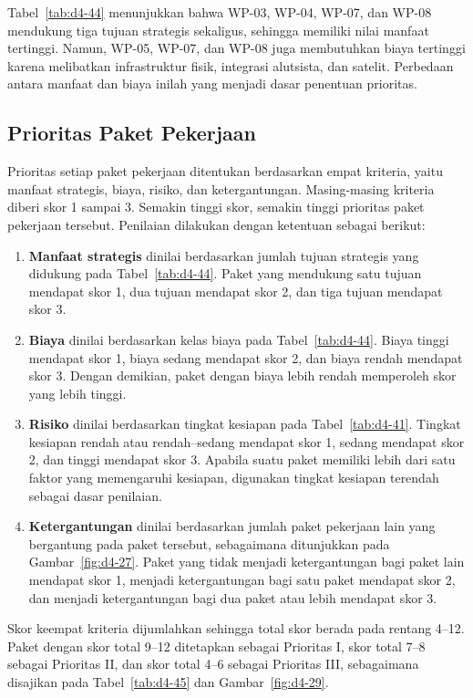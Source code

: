 Tabel~\ref{tab:d4-44} menunjukkan bahwa WP-03, WP-04, WP-07, dan WP-08 mendukung tiga tujuan strategis sekaligus, sehingga memiliki nilai manfaat tertinggi. Namun, WP-05, WP-07, dan WP-08 juga membutuhkan biaya tertinggi karena melibatkan infrastruktur fisik, integrasi alutsista, dan satelit. Perbedaan antara manfaat dan biaya inilah yang menjadi dasar penentuan prioritas.

\subsection{Prioritas Paket Pekerjaan}

Prioritas setiap paket pekerjaan ditentukan berdasarkan empat kriteria, yaitu manfaat strategis, biaya, risiko, dan ketergantungan. Masing-masing kriteria diberi skor 1 sampai 3. Semakin tinggi skor, semakin tinggi prioritas paket pekerjaan tersebut. Penilaian dilakukan dengan ketentuan sebagai berikut:

\begin{enumerate}[label=\alph*.]
  \item \textbf{Manfaat strategis} dinilai berdasarkan jumlah tujuan strategis yang didukung pada Tabel~\ref{tab:d4-44}. Paket yang mendukung satu tujuan mendapat skor 1, dua tujuan mendapat skor 2, dan tiga tujuan mendapat skor 3.
  \item \textbf{Biaya} dinilai berdasarkan kelas biaya pada Tabel~\ref{tab:d4-44}. Biaya tinggi mendapat skor 1, biaya sedang mendapat skor 2, dan biaya rendah mendapat skor 3. Dengan demikian, paket dengan biaya lebih rendah memperoleh skor yang lebih tinggi.
  \item \textbf{Risiko} dinilai berdasarkan tingkat kesiapan pada Tabel~\ref{tab:d4-41}. Tingkat kesiapan rendah atau rendah–sedang mendapat skor 1, sedang mendapat skor 2, dan tinggi mendapat skor 3. Apabila suatu paket memiliki lebih dari satu faktor yang memengaruhi kesiapan, digunakan tingkat kesiapan terendah sebagai dasar penilaian.
  \item \textbf{Ketergantungan} dinilai berdasarkan jumlah paket pekerjaan lain yang bergantung pada paket tersebut, sebagaimana ditunjukkan pada Gambar~\ref{fig:d4-27}. Paket yang tidak menjadi ketergantungan bagi paket lain mendapat skor 1, menjadi ketergantungan bagi satu paket mendapat skor 2, dan menjadi ketergantungan bagi dua paket atau lebih mendapat skor 3.
\end{enumerate}
Skor keempat kriteria dijumlahkan sehingga total skor berada pada rentang 4–12. Paket dengan skor total 9–12 ditetapkan sebagai Prioritas I, skor total 7–8 sebagai Prioritas II, dan skor total 4–6 sebagai Prioritas III, sebagaimana disajikan pada Tabel~\ref{tab:d4-45} dan Gambar~\ref{fig:d4-29}.

